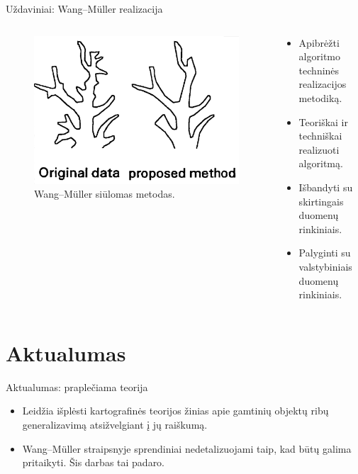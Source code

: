\documentclass[14pt]{beamer}
\newcommand{\WM}{Wang--M{\"u}ller}
\newcommand{\twocols}[2]
{
    \begin{columns}[c]
        \begin{column}{0.4\textwidth}
            #1
        \end{column}
        \begin{column}{0.6\textwidth}
            #2
        \end{column}
    \end{columns}
}
\begin{document}
\begin{frame}{Uždaviniai: {\WM} realizacija}
  \twocols{
    \begin{figure}[ht]
      \includegraphics[width=\textwidth]{wang125-2}
      \caption{{\WM} siūlomas metodas.}
    \end{figure}

  }{
    \begin{itemize}
        \item Apibrėžti algoritmo techninės realizacijos metodiką.
        \item Teoriškai ir techniškai realizuoti algoritmą.
        \item Išbandyti su skirtingais duomenų rinkiniais.
        \item Palyginti su valstybiniais duomenų rinkiniais.
    \end{itemize}
  }
\end{frame}

\section{Aktualumas}

\begin{frame}{Aktualumas: praplečiama teorija}
    \begin{itemize}[<+->]
        \item Leidžia išplėsti kartografinės teorijos žinias apie gamtinių
            objektų ribų generalizavimą atsižvelgiant į jų raiškumą.
        \item {\WM} straipsnyje sprendiniai nedetalizuojami taip, kad būtų
            galima pritaikyti. Šis darbas tai padaro.
    \end{itemize}
\end{frame}
\end{document}
